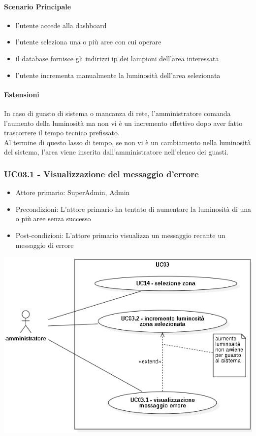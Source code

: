 \documentclass[12pt]{article}
\begin{document}
\paragraph{Scenario Principale}
\begin{itemize}
	\item l'utente accede alla dashboard
	\item l'utente seleziona una o più aree con cui operare
	\item il database fornisce gli indirizzi ip dei lampioni dell'area interessata
	\item l'utente incrementa manualmente la luminosità dell'area selezionata
\end{itemize}
\paragraph{Estensioni} In caso di guasto di sistema o mancanza di rete, l'amministratore comanda l'aumento della luminosità ma non vi è un incremento effettivo dopo aver fatto trascorrere il tempo tecnico prefissato.\\
Al termine di questo lasso di tempo, se non vi è un cambiamento nella luminosità del sistema, l'area viene inserita dall'amministratore nell'elenco dei guasti. 

\subsubsection{UC03.1 - Visualizzazione del messaggio d'errore}
\begin{itemize}
	\item Attore primario: SuperAdmin, Admin
	\item Precondizioni: L'attore primario ha tentato di aumentare la luminosità di una o più aree senza successo
	\item Post-condizioni: L'attore primario visualizza un messaggio recante un messaggio di errore
\end{itemize}

\includegraphics[scale=0.5]{UC03.png}
\end{document}
